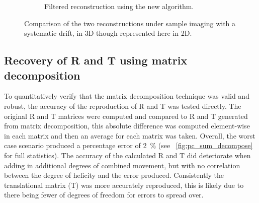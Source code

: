 \documentclass{osa-article}
\begin{document}
\begin{figure}
\begin{subfigure}[t]{0.3\textwidth}
    \caption{Filtered reconstruction using the new algorithm.}\label{fig:filtered_recon_helix}
  \end{subfigure}
   \hspace*{\fill}
  \caption{Comparison of the two reconstructions under sample imaging with a systematic drift, in 3D though represented here in 2D.}\label{fig:flopts}
\end{figure}

\subsection{Recovery of R and T using matrix decomposition}

To quantitatively verify that the matrix decomposition technique was valid and robust, the accuracy of the reproduction of \gls{R} and \gls{T} was tested directly.
The original \gls{R} and \gls{T} matrices were computed and compared to \gls{R} and \gls{T} generated from matrix decomposition, this absolute difference was computed element-wise in each matrix and then an average for each matrix was taken.
Overall, the worst case scenario produced a percentage error of \SI{2}{\percent} (see \figurename~\ref{fig:pc_sum_decompose} for full statistics).
The accuracy of the calculated \gls{R} and \gls{T} did deteriorate when adding in additional degrees of combined movement, but with no correlation between the degree of helicity and the error produced.
Consistently the translational matrix (\gls{T}) was more accurately reproduced, this is likely due to there being fewer of degrees of freedom for errors to spread over.
\end{document}

